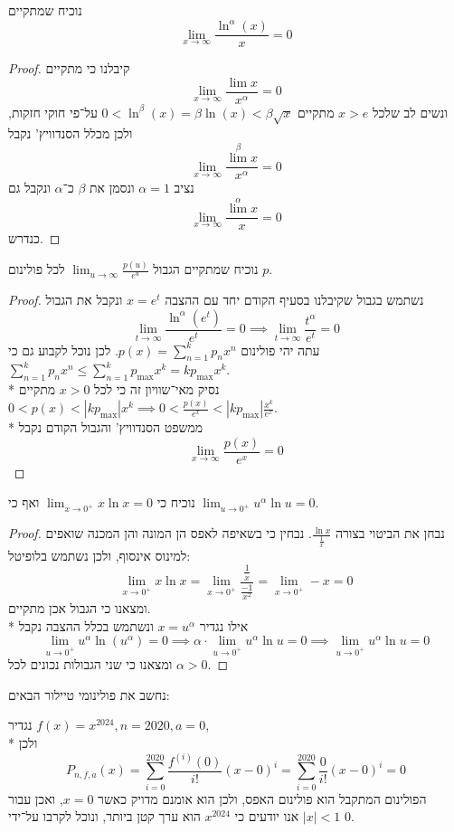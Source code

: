 \Subquestion{}
נוכיח שמתקיים
\[
	\lim_{x \to \infty} \frac{\ln^\alpha(x)}{x} = 0
\]
\begin{proof}
	קיבלנו כי מתקיים
	\[
		\lim_{x \to \infty} \frac{\lim x}{x^\alpha} = 0
	\]
	ונשים לב שלכל $x > e$ מתקיים $0 < \ln^\beta(x) = \beta \ln(x) < \beta \sqrt{x}$ על־פי חוקי חזקות, ולכן מכלל הסנדוויץ' נקבל
	\[
		\lim_{x \to \infty} \frac{\lim^\beta x}{x^\alpha} = 0
	\]
	נציב $\alpha = 1$ ונסמן את $\beta$ כ־$\alpha$ ונקבל גם
	\[
		\lim_{x \to \infty} \frac{\lim^\alpha x}{x} = 0
	\]
	כנדרש.
\end{proof}

\Subquestion{}
נוכיח שמתקיים הגבול $\lim_{u \to \infty} \frac{p(u)}{e^u}$ לכל פולינום $p$.
\begin{proof}
	נשתמש בגבול שקיבלנו בסעיף הקודם יחד עם ההצבה $x = e^t$ ונקבל את הגבול
	\[
		\lim_{t \to \infty} \frac{\ln^\alpha(e^t)}{e^t} = 0
		\implies
		\lim_{t \to \infty} \frac{t^\alpha}{e^t} = 0
	\]
	עתה יהי פולינום $p(x) = \sum_{n = 1}^{k} p_n x^n$. לכן נוכל לקבוע גם כי $\sum_{n = 1}^{k} p_n x^n \le \sum_{n = 1}^{k} p_{\max} x^k = k p_{\max} x^k$. \\*
	נסיק מאי־שוויון זה כי לכל $x > 0$ מתקיים $0 < p(x) < |k p_{\max}| x^k \implies 0 < \frac{p(x)}{e^x} < |k p_{\max}| \frac{x^k}{e^x}$. \\*
	ממשפט הסנדוויץ' והגבול הקודם נקבל
	\[
		\lim_{x \to \infty} \frac{p(x)}{e^x} = 0
	\]
\end{proof}

\Subquestion{}
נוכיח כי $\lim_{x \to 0^+}  x \ln x = 0$ ואף כי $\lim_{u \to 0^+} u^\alpha \ln u = 0$.
\begin{proof}
	נבחן את הביטוי בצורה $\frac{\ln x}{\frac{1}{x}}$. נבחין כי בשאיפה לאפס הן המונה והן המכנה שואפים למינוס אינסוף, ולכן נשתמש בלופיטל:
	\[
		\lim_{x \to 0^+} x \ln x 
		= \lim_{x \to 0^+} \frac{\frac{1}{x}}{\frac{-1}{x^2}} 
		= \lim_{x \to 0^+} -x
		= 0
	\]
	ומצאנו כי הגבול אכן מתקיים. \\*
	אילו נגדיר $x = u^\alpha$ ונשתמש בכלל ההצבה נקבל
	\[
		\lim_{u \to 0^+} u^\alpha \ln(u^\alpha) = 0
		\implies
		\alpha \cdot \lim_{u \to 0^+} u^\alpha \ln u = 0
		\implies
		\lim_{u \to 0^+} u^\alpha \ln u = 0
	\]
	ומצאנו כי שני הגבולות נכונים לכל $\alpha > 0$.
\end{proof}

\Question{}
נחשב את פולינומי טיילור הבאים:

\Subquestion{}
נגדיר $f(x) = x^{2024}, n = 2020, a = 0$, \\*
ולכן
\[
	P_{n, f, a}(x)
	= \sum_{i = 0}^{2020} \frac{f^{(i)}(0)}{i!} {(x - 0)}^i
	= \sum_{i = 0}^{2020} \frac{0}{i!} {(x - 0)}^i
	= 0
\]
הפולינום המתקבל הוא פולינום האפס, ולכן הוא אומנם מדויק כאשר $x = 0$, ואכן עבור $|x| < 1$ אנו יודעים כי $x^{2024}$ הוא ערך קטן ביותר, ונוכל לקרבו על־ידי $0$.

